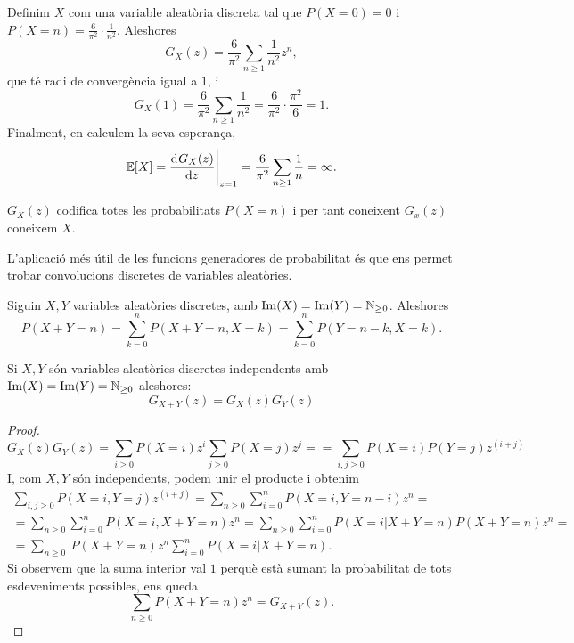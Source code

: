 \begin{example}
   Definim $X$ com una variable aleatòria discreta tal que $P(X = 0) = 0$ i
   $P(X = n) = \frac{6}{\pi^2}\cdot \frac{1}{n^2}$. Aleshores
    \[
        G_X(z) =  \frac{6}{\pi^2} \sum_{n \geq 1} \frac{1}{n^2}z^n,
    \]
    que t\'e radi de convergència igual a $1$, i
    \[
        G_X(1) = \frac{6}{\pi^2} \sum_{n \geq 1} \frac{1}{n^2} =
        \frac{6}{\pi^2}\cdot \frac{\pi^2}{6} = 1.
    \]
    Finalment, en calculem la seva esperança,
    \[
        \esp[X] = \eval{\dv{G_X(z)}{z}}_{z = 1} = 
        \frac{6}{\pi^2}\sum_{n \geq 1} \frac{1}{n} = \infty.
    \]
\end{example}

\begin{obs}
    $G_X(z)$ codifica totes les probabilitats $P(X = n)$ i per tant coneixent
    $G_x(z)$ coneixem $X$.
\end{obs}

L'aplicació m\'es útil de les funcions generadores de probabilitat \'es que
ens permet trobar convolucions discretes de variables aleatòries.

\begin{obs}
    Siguin $X, Y$ variables aleatòries discretes, amb $\operatorname{Im}(X) = \operatorname{Im}(Y) =
    \mathbb{N}_{\geq 0}$. Aleshores
    \[
        P(X+Y = n) = \sum_{k = 0}^{n} P(X+Y = n, X = k) = 
        \sum_{k = 0}^{n} P(Y = n-k, X = k). 
    \]
\end{obs}

\begin{prop}
    Si $X, Y$ són variables aleatòries discretes independents amb $\operatorname{Im}(X) = \operatorname{Im}(Y) =
    \mathbb{N}_{\geq 0}$ aleshores:
    \[
        G_{X+Y}(z) = G_X(z)G_Y(z)
    \]
\end{prop}

\begin{proof}
    \[
        G_X(z)G_Y(z) = \sum_{i \geq 0} P(X = i) z^i  \sum_{j \geq 0} P(X = j) z^j =
        = \sum_{i, j \geq 0} P(X = i)P(Y = j) z^{(i+j)}
    \]
    I, com $X,Y$ són independents, podem unir el producte i obtenim
    \begin{gather*} 
        \sum_{i, j \geq 0} P(X = i, Y = j) z^{(i+j)} = \sum_{n \geq 0} \sum_{i = 0}^n
        P(X = i, Y = n-i)z^n =\\
        = \sum_{n \geq 0} \sum_{i = 0}^n P(X = i, X+Y = n)z^n 
        = \sum_{n \geq 0} \sum_{i = 0}^n P(X = i | X+Y = n) P(X+Y = n)z^n = \\
        = \sum_{n \geq 0} \ P(X+Y = n)z^n \sum_{i = 0}^n P(X = i | X+Y = n).
    \end{gather*}
    Si observem que la suma interior val $1$ perquè està sumant la probabilitat de tots
    esdeveniments possibles, ens queda
    \[
        \sum_{n \geq 0} P(X+Y = n)z^n = G_{X+Y}(z).
    \]
\end{proof}

